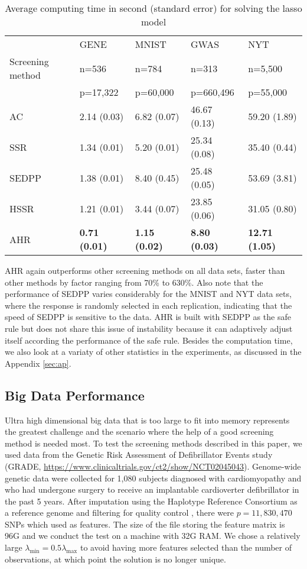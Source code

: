 \begin{table}[H]
\centering
\begin{tabular}{lllll}
\toprule
 & GENE & MNIST & GWAS & NYT \\
Screening method & n=536 & n=784 & n=313 & n=5,500 \\
       & p=17,322 & p=60,000 & p=660,496 & p=55,000 \\
\midrule
AC & 2.14 (0.03) & 6.82 (0.07) & 46.67 (0.13) & 59.20 (1.89) \\
SSR & 1.34 (0.01) & 5.20 (0.01) & 25.34 (0.08) & 35.40 (0.44) \\
SEDPP & 1.38 (0.01) & 8.40 (0.45) & 25.48 (0.05) & 53.69 (3.81) \\
HSSR & 1.21 (0.01) & 3.44 (0.07) & 23.85 (0.06) & 31.05 (0.80) \\
AHR & \textbf{0.71 (0.01)} & \textbf{1.15 (0.02)} & \textbf{8.80 (0.03)} & \textbf{12.71 (1.05)} \\
\bottomrule
\end{tabular}
\caption{Average computing time in second (standard error) for solving the lasso model}
\label{Tab:real}
\end{table}

AHR again outperforms other screening methods on all data sets, faster than other methods by factor ranging from 70\% to 630\%. Also note that the performance of SEDPP varies considerably for the MNIST and NYT data sets, where the response is randomly selected in each replication, indicating that the speed of SEDPP is sensitive to the data. AHR is built with SEDPP as the safe rule but does not share this issue of instability because it can adaptively adjust itself according the performance of the safe rule. Besides the computation time, we also look at a variaty of other statistics in the experiments, as discussed in the Appendix \ref{sec:ap}.

\subsection{Big Data Performance}

Ultra high dimensional big data that is too large to fit into memory represents the greatest challenge and the scenario where the help of a good screening method is needed most. To test the screening methods described in this paper, we used data from the Genetic Risk Assessment of Defibrillator Events study (GRADE, \url{https://www.clinicaltrials.gov/ct2/show/NCT02045043}). Genome-wide genetic data were collected for 1,080 subjects diagnosed with cardiomyopathy and who had undergone surgery to receive an implantable cardioverter defibrillator in the past 5 years. After imputation using the Haplotype Reference Consortium as a reference genome and filtering for quality control \citep{Das2016}, there were $p=11,830,470$ SNPs which used as features. The size of the file storing the feature matrix is 96G and we conduct the test on a machine with 32G RAM. We chose a relatively large $\lambda_{\min} =0.5\lambda_{\max}$ to avoid having more features selected than the number of observations, at which point the solution is no longer unique.

